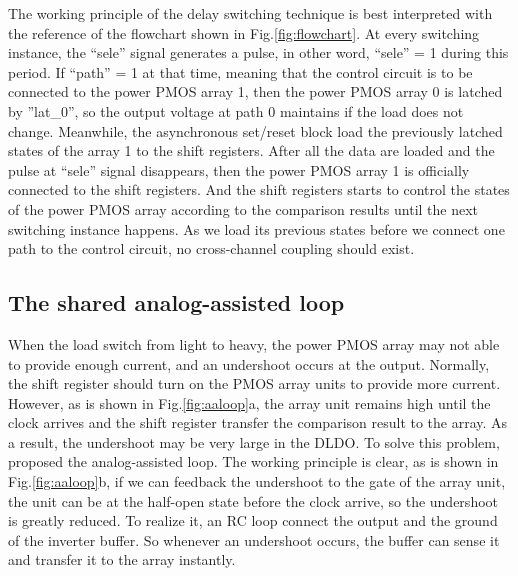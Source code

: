\documentclass[journal]{IEEEtran}
\begin{document}
The working principle of the delay switching technique is best interpreted with the reference of the flowchart shown in Fig.\ref{fig:flowchart}. At every switching instance, the ``sele'' signal generates a pulse, in other word, ``sele'' = 1 during this period. If ``path'' = 1 at that time, meaning that the control circuit is to be connected to the power PMOS array 1, then the power PMOS array 0 is latched by ''lat\_0'', so the output voltage at path 0 maintains if the load does not change. Meanwhile, the asynchronous set/reset block load the previously latched states of the array 1 to the shift registers. After all the data are loaded and the pulse at ``sele'' signal disappears, then the power PMOS array 1 is officially connected to the shift registers. And the shift registers starts to control the states of the power PMOS array according to the comparison results until the next switching instance happens. As we load its previous states before we connect one path to the control circuit, no cross-channel coupling should exist.

\subsection{The shared analog-assisted loop}
When the load switch from light to heavy, the power PMOS array may not able to provide enough current, and an undershoot occurs at the output. Normally, the shift register should turn on the PMOS array units to provide more current. However, as is shown in Fig.\ref{fig:aaloop}a, the array unit remains high until the clock arrives and the shift register transfer the comparison result to the array. As a result, the undershoot may be very large in the DLDO. To solve this problem, \cite{AALDO} proposed the analog-assisted loop. The working principle is clear, as is shown in Fig.\ref{fig:aaloop}b, if we can feedback the undershoot to the gate of the array unit, the unit can be at the half-open state before the clock arrive, so the undershoot is greatly reduced. To realize it, an RC loop connect the output and the ground of the inverter buffer. So whenever an undershoot occurs, the buffer can sense it and transfer it to the array instantly.
\end{document}
